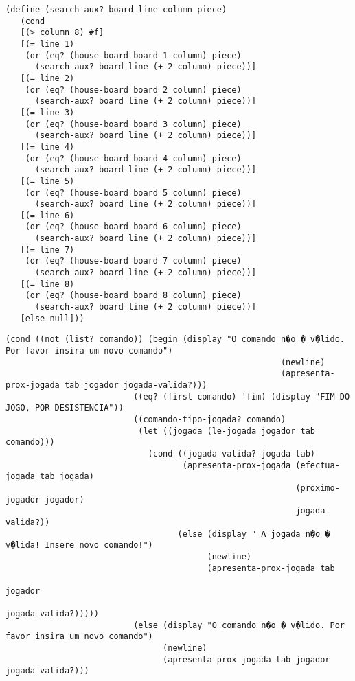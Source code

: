 \begin{lstlisting}[basicstyle=\ttfamily, caption="example"]
  (define (search-aux? board line column piece)
   (cond
   [(> column 8) #f]
   [(= line 1)
    (or (eq? (house-board board 1 column) piece)
      (search-aux? board line (+ 2 column) piece))]
   [(= line 2)
    (or (eq? (house-board board 2 column) piece)
      (search-aux? board line (+ 2 column) piece))]
   [(= line 3)
    (or (eq? (house-board board 3 column) piece)
      (search-aux? board line (+ 2 column) piece))]
   [(= line 4)
    (or (eq? (house-board board 4 column) piece)
      (search-aux? board line (+ 2 column) piece))]
   [(= line 5)
    (or (eq? (house-board board 5 column) piece)
      (search-aux? board line (+ 2 column) piece))]
   [(= line 6)
    (or (eq? (house-board board 6 column) piece)
      (search-aux? board line (+ 2 column) piece))]
   [(= line 7)
    (or (eq? (house-board board 7 column) piece)
      (search-aux? board line (+ 2 column) piece))]
   [(= line 8)
    (or (eq? (house-board board 8 column) piece)
      (search-aux? board line (+ 2 column) piece))]
   [else null]))
\end{lstlisting}


\begin{lstlisting}[basicstyle=\ttfamily, caption="example"]
(cond ((not (list? comando)) (begin (display "O comando n�o � v�lido. Por favor insira um novo comando")
                                                        (newline)
                                                        (apresenta-prox-jogada tab jogador jogada-valida?)))
                          ((eq? (first comando) 'fim) (display "FIM DO JOGO, POR DESISTENCIA"))
                          ((comando-tipo-jogada? comando)
                           (let ((jogada (le-jogada jogador tab comando)))
                             (cond ((jogada-valida? jogada tab)
                                    (apresenta-prox-jogada (efectua-jogada tab jogada)
                                                           (proximo-jogador jogador)
                                                           jogada-valida?))
                                   (else (display " A jogada n�o � v�lida! Insere novo comando!")
                                         (newline)
                                         (apresenta-prox-jogada tab
                                                                jogador
                                                                jogada-valida?)))))
                          (else (display "O comando n�o � v�lido. Por favor insira um novo comando")
                                (newline)
                                (apresenta-prox-jogada tab jogador jogada-valida?)))
\end{lstlisting}
